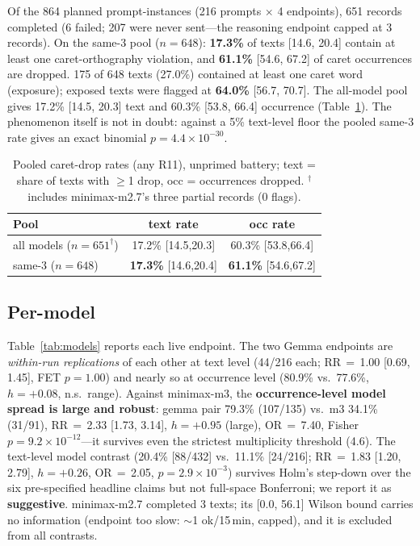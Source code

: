 \documentclass[11pt]{article}
\begin{document}
Of the 864 planned prompt-instances (216 prompts $\times$ 4 endpoints), 651 records completed (6 failed; 207 were never sent---the reasoning endpoint capped at 3 records). On the same-3 pool ($n{=}648$): \textbf{17.3\%} of texts [14.6, 20.4] contain at least one caret-orthography violation, and \textbf{61.1\%} [54.6, 67.2] of caret occurrences are dropped. 175 of 648 texts (27.0\%) contained at least one caret word (exposure); exposed texts were flagged at \textbf{64.0\%} [56.7, 70.7]. The all-model pool gives 17.2\% [14.5, 20.3] text and 60.3\% [53.8, 66.4] occurrence (Table~\ref{tab:pooled}). The phenomenon itself is not in doubt: against a 5\% text-level floor the pooled same-3 rate gives an exact binomial $p = 4.4\times10^{-30}$.

\begin{table}[t]
\centering
\scriptsize
\begin{tabular}{lcc}
\toprule
Pool & text rate & occ rate \\
\midrule
all models ($n{=}651^{\dagger}$) & 17.2\% [14.5,20.3] & 60.3\% [53.8,66.4] \\
same-3 ($n{=}648$) & \textbf{17.3\%} [14.6,20.4] & \textbf{61.1\%} [54.6,67.2] \\
\bottomrule
\end{tabular}
\caption{Pooled caret-drop rates (any R11), unprimed battery; text = share of texts with $\geq$1 drop, occ = occurrences dropped. $^{\dagger}$includes minimax-m2.7's three partial records (0 flags).}
\label{tab:pooled}
\end{table}

\subsection{Per-model}

Table~\ref{tab:models} reports each live endpoint. The two Gemma endpoints are \emph{within-run replications} of each other at text level (44/216 each; RR\,$=$\,1.00 [0.69, 1.45], FET $p{=}1.00$) and nearly so at occurrence level (80.9\% vs.\ 77.6\%, $h{=}+0.08$, n.s.\ range). Against minimax-m3, the \textbf{occurrence-level model spread is large and robust}: gemma pair 79.3\% (107/135) vs.\ m3 34.1\% (31/91), RR\,$=$\,2.33 [1.73, 3.14], $h{=}+0.95$ (large), OR\,$=$\,7.40, Fisher $p{=}9.2\times10^{-12}$---it survives even the strictest multiplicity threshold (4.6). The text-level model contrast (20.4\% [88/432] vs.\ 11.1\% [24/216]; RR\,$=$\,1.83 [1.20, 2.79], $h{=}+0.26$, OR\,$=$\,2.05, $p{=}2.9\times10^{-3}$) survives Holm's step-down over the six pre-specified headline claims but not full-space Bonferroni; we report it as \textbf{suggestive}. minimax-m2.7 completed 3 texts; its [0.0, 56.1] Wilson bound carries no information (endpoint too slow: $\sim$1 ok/15\,min, capped), and it is excluded from all contrasts.
\end{document}
